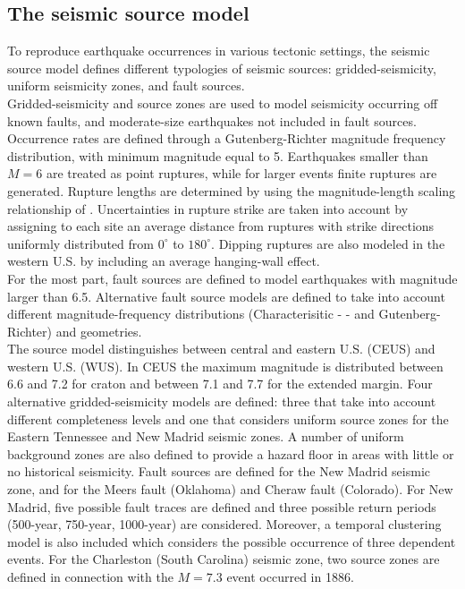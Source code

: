 \subsection{The seismic source model}
To reproduce earthquake occurrences in various tectonic settings, the seismic source model defines different typologies of seismic sources: gridded-seismicity, uniform seismicity zones, and fault sources. \\
Gridded-seismicity and source zones are used to model seismicity occurring off known faults, and moderate-size earthquakes not included in fault sources. Occurrence rates are defined through a Gutenberg-Richter magnitude frequency distribution, with minimum magnitude equal to 5. Earthquakes smaller than $M=6$ are treated as point ruptures, while for larger events finite ruptures are generated. Rupture lengths are determined by using the magnitude-length scaling relationship of \cite{wells1994}. Uncertainties in rupture strike are taken into account by assigning to each site an average distance from ruptures with strike directions uniformly distributed from $0^{\circ}$ to $180^{\circ}$. Dipping ruptures are also modeled in the western U.S. by including an average hanging-wall effect.\\
For the most part, fault sources are defined to model earthquakes with magnitude larger than 6.5. Alternative fault source models are defined to take into account different magnitude-frequency distributions (Characterisitic - \cite{schwartscoppersmith1984} - and Gutenberg-Richter) and geometries.\\
The source model distinguishes between central and eastern U.S. (CEUS) and western U.S. (WUS). In CEUS the maximum magnitude is distributed between 6.6 and 7.2 for craton and between 7.1 and 7.7 for the extended margin. Four alternative gridded-seismicity models are defined: three that take into account different completeness levels and one that considers uniform source zones for the Eastern Tennessee and New Madrid seismic zones. A number of uniform background zones are also defined to provide a hazard floor in areas with little or no historical seismicity. Fault sources are defined for the New Madrid seismic zone, and for the Meers fault (Oklahoma) and Cheraw fault (Colorado). For New Madrid, five possible fault traces are defined and three possible return periods (500-year, 750-year, 1000-year) are considered. Moreover, a temporal clustering model is also included which considers the possible occurrence of three dependent events. For the Charleston (South Carolina) seismic zone, two source zones are defined in connection with the $M=7.3$ event occurred in 1886.\\
